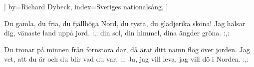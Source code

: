 

[
by={Richard Dybeck},
index={Sveriges nationalsång},
]

\beginverse*
 Du gamla, du fria, du fjällhöga Nord,
du tysta, du glädjerika sköna!
Jag hälsar dig, vänaste land uppå jord,
:,: din sol, din himmel, dina ängder gröna. :,:
\endverse

\beginverse*
Du tronar på minnen från fornstora dar, 
då ärat ditt namn flög över jorden.
Jag vet, att du är och du blir vad du var.
:,: Ja, jag vill leva, jag vill dö i Norden. :,:
\endverse
\endsong


